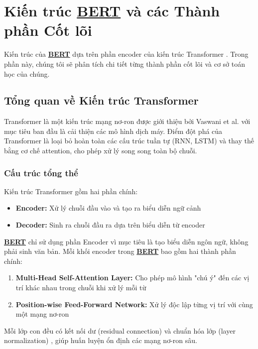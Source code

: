\section{Kiến trúc \hyperref[acro:bert]{\textbf{BERT}} và các Thành phần Cốt lõi}
\label{sec:kien_truc_bert}

Kiến trúc của \hyperref[acro:bert]{\textbf{BERT}} dựa trên phần encoder của kiến trúc Transformer \cite{vaswani2017attention}. Trong phần này, chúng tôi sẽ phân tích chi tiết từng thành phần cốt lõi và cơ sở toán học của chúng.

\subsection{Tổng quan về Kiến trúc Transformer}
\label{ssec:tong_quan_transformer}

Transformer là một kiến trúc mạng nơ-ron được giới thiệu bởi Vaswani et al. \cite{vaswani2017attention} với mục tiêu ban đầu là cải thiện các mô hình dịch máy. Điểm đột phá của Transformer là loại bỏ hoàn toàn các cấu trúc tuần tự (RNN, LSTM) và thay thế bằng cơ chế attention, cho phép xử lý song song toàn bộ chuỗi.

\subsubsection{Cấu trúc tổng thể}
Kiến trúc Transformer gồm hai phần chính:
\begin{itemize}
    \item \textbf{Encoder:} Xử lý chuỗi đầu vào và tạo ra biểu diễn ngữ cảnh
    \item \textbf{Decoder:} Sinh ra chuỗi đầu ra dựa trên biểu diễn từ encoder
\end{itemize}

\hyperref[acro:bert]{\textbf{BERT}} chỉ sử dụng phần Encoder vì mục tiêu là tạo biểu diễn ngôn ngữ, không phải sinh văn bản. Mỗi khối encoder trong \hyperref[acro:bert]{\textbf{BERT}} bao gồm hai thành phần chính:

\begin{enumerate}
    \item \textbf{Multi-Head Self-Attention Layer:} Cho phép mô hình "chú ý" đến các vị trí khác nhau trong chuỗi khi xử lý mỗi từ
    \item \textbf{Position-wise Feed-Forward Network:} Xử lý độc lập từng vị trí với cùng một mạng nơ-ron
\end{enumerate}

Mỗi lớp con đều có kết nối dư (residual connection) và chuẩn hóa lớp (layer normalization) \cite{ba2016layer}, giúp huấn luyện ổn định các mạng nơ-ron sâu.

